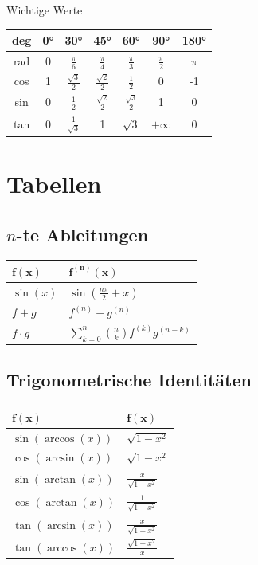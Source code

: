 \documentclass[a4paper,10pt]{article}
\begin{document}
\begin{mainbox}{Wichtige Werte}
  \begin{center} 
    \begin{tabular}{c|cccccc}
      deg & 0° & 30° & 45° & 60° & 90° & 180° \\
      \midrule
      rad & 0 & $\frac{\pi}{6}$ & $\frac{\pi}{4}$ & $\frac{\pi}{3}$ & $\frac{\pi}{2}$ & $\pi$ \\
      cos & 1 & $\frac{\sqrt{3}}{2}$ & $\frac{\sqrt{2}}{2}$ & $\frac{1}{2}$ & 0 & -1 \\
      sin & 0 & $\frac{1}{2}$ & $\frac{\sqrt{2}}{2}$ & $\frac{\sqrt{3}}{2}$ & 1 & 0 \\
      tan & 0 & $\frac{1}{\sqrt{3}}$ & 1 & $\sqrt{3}$ & $+\infty$ & 0 \\
    \end{tabular}
  \end{center}
\end{mainbox}

\section{Tabellen}

\subsection{$n$-te Ableitungen}
\begin{center}
  \begin{tabularx}{\linewidth}{>{\centering\arraybackslash}X>{\centering\arraybackslash}X}
  \toprule
  $\mathbf{f(x)}$ & $\mathbf{f^{(n)}(x)}$ \\
  \midrule
  $\sin(x)$ & $\sin(\frac{n\pi}{2} + x)$\\
  $f + g$ & $f^{(n)} + g^{(n)}$\\
  $f \cdot g$ & $\sum\limits_{k=0}^{n}\binom{n}{k}f^{(k)}g^{(n-k)}$\\
  \bottomrule
  \end{tabularx}
\end{center}

\subsection{Trigonometrische Identitäten}
\begin{center}
 \begin{tabularx}{\linewidth}{>{\centering\arraybackslash}X>{\centering\arraybackslash}X}
  \toprule
  $\mathbf{f(x)}$ & $\mathbf{f(x)}$ \\
  \midrule
  $\sin(\arccos (x))$ & $\sqrt{1-x^2}$\\
  $\cos(\arcsin(x))$ & $\sqrt{1-x^2}$\\
  $\sin(\arctan(x))$ & $\frac{x}{\sqrt{1+x^2}}$\\
  $\cos(\arctan(x))$ & $\frac{1}{\sqrt{1+x^2}}$\\
  $\tan(\arcsin(x))$ & $\frac{x}{\sqrt{1-x^2}}$\\
  $\tan(\arccos(x))$ & $\frac{\sqrt{1-x^2}}{x}$\\
  \bottomrule
 \end{tabularx}
\end{center}
\end{document}
